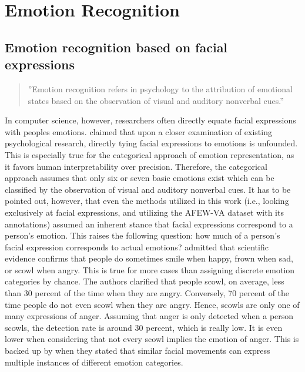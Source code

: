 
\section{Emotion Recognition}
\subsection{Emotion recognition based on facial expressions}
\begin{quote}
    ''Emotion recognition refers in psychology to the attribution of emotional states based on the observation of visual and auditory nonverbal cues.'' \citep[~p. 3935]{Baenziger:2014:MeasuringERAbility}
\end{quote}
In computer science, however, researchers often directly equate facial expressions with peoples emotions. \citet{Barrett:2019:EmotionalFromFacialMovements} claimed that upon a closer examination of existing psychological research, directly tying facial expressions to emotions is unfounded. This is especially true for the categorical approach of emotion representation, as it favors human interpretability over precision. Therefore, the categorical approach assumes that only six or seven basic emotions exist which can be classified by the observation of visual and auditory nonverbal cues.
\newline\newline
It has to be pointed out, however, that even the methods utilized in this work (i.e., looking exclusively at facial expressions, and utilizing the AFEW-VA dataset with its annotations) assumed an inherent stance that facial expressions correspond to a person’s emotion. This raises the following question: how much of a person's facial expression corresponds to actual emotions?
\newline\newline
\citet{Barrett:2019:EmotionalFromFacialMovements} admitted that scientific evidence confirms that people do sometimes smile when happy, frown when sad, or scowl when angry. This is true for more cases than assigning discrete emotion categories by chance. The authors clarified that people scowl, on average, less than 30 percent of the time when they are angry. Conversely, 70 percent of the time people do not even scowl when they are angry. Hence, scowls are only one of many expressions of anger. Assuming that anger is only detected when a person scowls, the detection rate is around 30 percent, which is really low. It is even lower when considering that not every scowl implies the emotion of anger. This is backed up by \citet{Barrett:2019:EmotionalFromFacialMovements} when they stated that similar facial movements can express multiple instances of different emotion categories.
